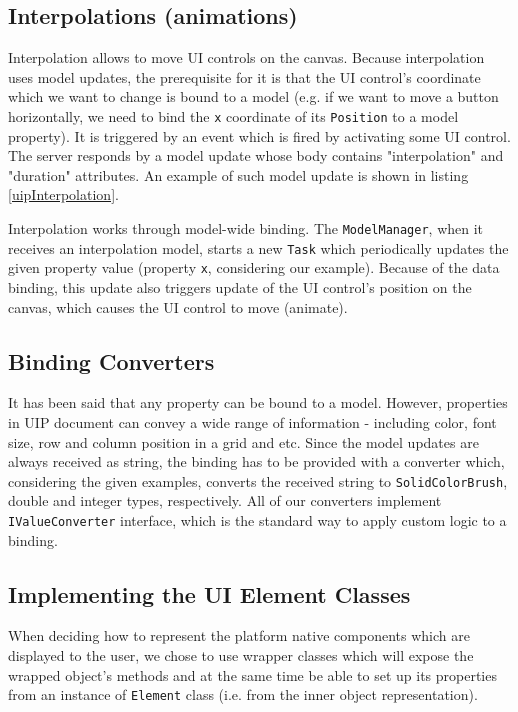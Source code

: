 \subsection{Interpolations (animations)}
Interpolation allows to move UI controls on the canvas. Because interpolation uses model updates, the prerequisite for it is that the UI control's coordinate which we want to change is bound to a model (e.g. if we want to move a button horizontally, we need to bind the \texttt{x} coordinate of its \texttt{Position} to a model property). It is triggered by an event which is fired by activating some UI control. The server responds by a model update whose body contains "interpolation" and "duration" attributes. An example of such model update is shown in listing \ref{uipInterpolation}.



Interpolation works through model-wide binding. The \texttt{ModelManager}, when it receives an interpolation model, starts a new \texttt{Task} which periodically updates the given property value (property \texttt{x}, considering our example). Because of the data binding, this update also triggers update of the UI control's position on the canvas, which causes the UI control to move (animate).

\subsection{Binding Converters}
It has been said that any property can be bound to a model. However, properties in UIP document can convey a wide range of information - including color, font size, row and column position in a grid and etc. Since the model updates are always received as string, the binding has to be provided with a converter which, considering the given examples, converts the received string to \texttt{SolidColorBrush}, double and integer types, respectively. All of our converters implement \texttt{IValueConverter} interface, which is the standard way to apply custom logic to a binding.

\subsection{Implementing the UI Element Classes}
When deciding how to represent the platform native components which are displayed to the user, we chose to use wrapper classes which will expose the wrapped object's methods and at the same time be able to set up its properties from an instance of \texttt{Element} class (i.e. from the inner object representation).

